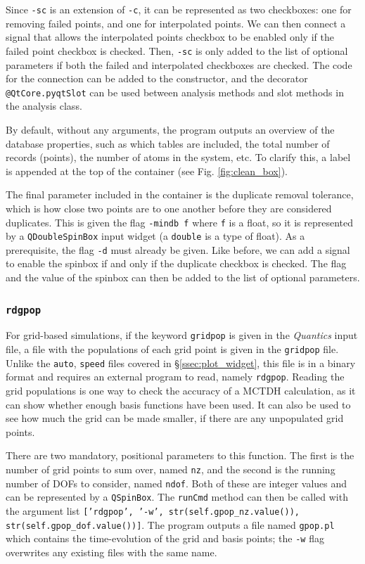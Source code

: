 \documentclass[12pt]{article}
\begin{document}
Since \texttt{-sc} is an extension of \texttt{-c}, it can be represented as two checkboxes: one for removing failed points, and one for interpolated points. We can then connect a signal that allows the interpolated points checkbox to be enabled only if the failed point checkbox is checked. Then, \texttt{-sc} is only added to the list of optional parameters if both the failed and interpolated checkboxes are checked. The code for the connection can be added to the constructor, and the decorator \texttt{@QtCore.pyqtSlot} can be used between analysis methods and slot methods in the analysis class.

By default, without any arguments, the program outputs an overview of the database properties, such as which tables are included, the total number of records (points), the number of atoms in the system, etc. To clarify this, a label is appended at the top of the container (see Fig. \ref{fig:clean_box}).

The final parameter included in the container is the duplicate removal tolerance, which is how close two points are to one another before they are considered duplicates. This is given the flag \texttt{-mindb f} where \texttt{f} is a float, so it is represented by a \texttt{QDoubleSpinBox} input widget (a \texttt{double} is a type of float). As a prerequisite, the flag \texttt{-d} must already be given. Like before, we can add a signal to enable the spinbox if and only if the duplicate checkbox is checked. The flag and the value of the spinbox can then be added to the list of optional parameters.

\subsubsection{\texttt{rdgpop}}\label{sssec:rdgpop}

For grid-based simulations, if the keyword \texttt{gridpop} is given in the \textit{Quantics} input file, a file with the populations of each grid point is given in the \texttt{gridpop} file. Unlike the \texttt{auto}, \texttt{speed} files covered in \S\ref{ssec:plot_widget}, this file is in a binary format and requires an external program to read, namely \texttt{rdgpop}. Reading the grid populations is one way to check the accuracy of a MCTDH calculation, as it can show whether enough basis functions have been used. It can also be used to see how much the grid can be made smaller, if there are any unpopulated grid points.

There are two mandatory, positional parameters to this function. The first is the number of grid points to sum over, named \texttt{nz}, and the second is the running number of DOFs to consider, named \texttt{ndof}. Both of these are integer values and can be represented by a \texttt{QSpinBox}. The \texttt{runCmd} method can then be called with the argument list \texttt{['rdgpop', '-w', str(self.gpop_nz.value()), str(self.gpop_dof.value())]}. The program outputs a file named \texttt{gpop.pl} which contains the time-evolution of the grid and basis points; the \texttt{-w} flag overwrites any existing files with the same name.
\end{document}
